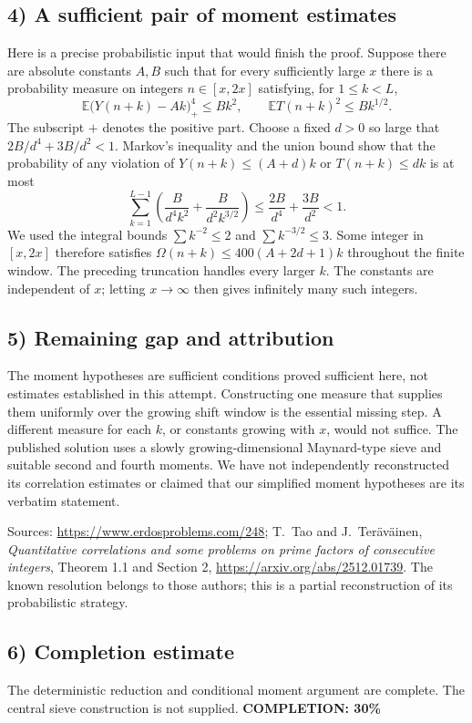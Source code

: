 \subsection{4) A sufficient pair of moment estimates}
Here is a precise probabilistic input that would finish the proof.
Suppose there are absolute constants $A,B$ such that for every
sufficiently large $x$ there is a probability measure on integers
$n\in[x,2x]$ satisfying, for $1\leq k<L$,
\[
 \mathbb E\bigl(Y(n+k)-Ak\bigr)_+^4\leq Bk^2,
 \qquad
 \mathbb E T(n+k)^2\leq Bk^{1/2}.
\]
The subscript $+$ denotes the positive part.
Choose a fixed $d>0$ so large that
$2B/d^4+3B/d^2<1$.
Markov's inequality and the union bound show that the probability
of any violation of
$Y(n+k)\leq(A+d)k$ or $T(n+k)\leq dk$ is at most
\[
 \sum_{k=1}^{L-1}
   \left(\frac{B}{d^4k^2}+\frac{B}{d^2k^{3/2}}\right)
 \leq\frac{2B}{d^4}+\frac{3B}{d^2}<1.
\]
We used the integral bounds $\sum k^{-2}\leq2$ and
$\sum k^{-3/2}\leq3$. Some integer in $[x,2x]$ therefore
satisfies
$\Omega(n+k)\leq400(A+2d+1)k$ throughout the finite window.
The preceding truncation handles every larger $k$.
The constants are independent of $x$; letting $x\to\infty$
then gives infinitely many such integers.

\subsection{5) Remaining gap and attribution}
The moment hypotheses are sufficient conditions proved sufficient
here, not estimates established in this attempt. Constructing
one measure that supplies them uniformly over the growing shift
window is the essential missing step. A different measure for
each $k$, or constants growing with $x$, would not suffice.
The published solution uses a slowly growing-dimensional
Maynard-type sieve and suitable second and fourth moments.
We have not independently reconstructed its correlation estimates
or claimed that our simplified moment hypotheses are its
verbatim statement.

Sources: \url{https://www.erdosproblems.com/248};
T.~Tao and J.~Ter\"av\"ainen,
\emph{Quantitative correlations and some problems on prime
factors of consecutive integers}, Theorem 1.1 and Section 2,
\url{https://arxiv.org/abs/2512.01739}.
The known resolution belongs to those authors; this is a partial
reconstruction of its probabilistic strategy.

\subsection{6) Completion estimate}
The deterministic reduction and conditional moment argument are
complete. The central sieve construction is not supplied.
\textbf{COMPLETION: 30\%}

